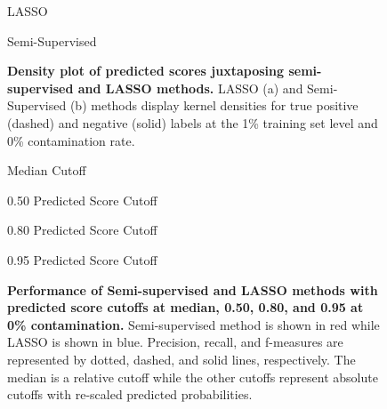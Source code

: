 \documentclass{bmcart}
\def\texttt{[image: ]}
\begin{document}
\begin{backmatter}
\begin{figure}[ht]
    \centering
        \caption{LASSO}
        \caption{Semi-Supervised}
\vspace{1cm}
    \caption{\textbf{Density plot of predicted scores juxtaposing semi-supervised and LASSO methods.} LASSO (a) and Semi-Supervised (b) methods display kernel densities for true positive (dashed) and negative (solid) labels at the 1\% training set level and 0\% contamination rate.}
    \label{fig:hist}
\end{figure}

\begin{figure}[ht]
    \centering
        \caption{Median Cutoff}
        \caption{0.50 Predicted Score Cutoff}
        \caption{0.80 Predicted Score Cutoff}
        \caption{0.95 Predicted Score Cutoff}
    \vspace{1cm}
    \caption{\textbf{Performance of Semi-supervised and LASSO methods with predicted score cutoffs at median, 0.50, 0.80, and 0.95 at 0\% contamination.} Semi-supervised method is shown in red while LASSO is shown in blue. Precision, recall, and f-measures are represented by dotted, dashed, and solid lines, respectively. The median is a relative cutoff while the other cutoffs represent absolute cutoffs with re-scaled predicted probabilities.}
    \label{fig:perf0}
\end{figure}



\end{backmatter}
\end{document}

